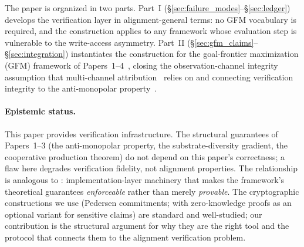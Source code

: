 The paper is organized in two parts.  Part~I (\S\ref{sec:failure_modes}--\S\ref{sec:ledger}) develops the verification layer in
alignment-general terms: no GFM vocabulary is required, and the
construction applies to any framework whose evaluation step is
vulnerable to the write-access asymmetry.  Part~II
(\S\ref{sec:gfm_claims}--\S\ref{sec:integration}) instantiates the
construction for the goal-frontier maximization (GFM) framework of
Papers~1--4~\citep{lasser2026gfm, lasser2026poset, lasser2026horizon,
lasser2026scm}, closing the observation-channel integrity assumption
that multi-channel attribution~\citep{lasser2026scm} relies on and
connecting verification integrity to the anti-monopolar
property~\citep{lasser2026horizon}.

\paragraph{Epistemic status.}
This paper provides verification infrastructure.  The structural
guarantees of Papers~1--3 (the anti-monopolar property, the
substrate-diversity gradient, the cooperative production theorem) do not
depend on this paper's correctness; a flaw here degrades verification
fidelity, not alignment properties.  The relationship is analogous to
\citet{lasser2026scm}: implementation-layer machinery that makes the framework's
theoretical guarantees \emph{enforceable} rather than merely
\emph{provable}.  The cryptographic constructions we use (Pedersen commitments; with
zero-knowledge proofs as an optional variant for sensitive claims) are
standard and well-studied; our contribution is the structural argument
for why they are the right tool and the protocol that connects them to
the alignment verification problem.
